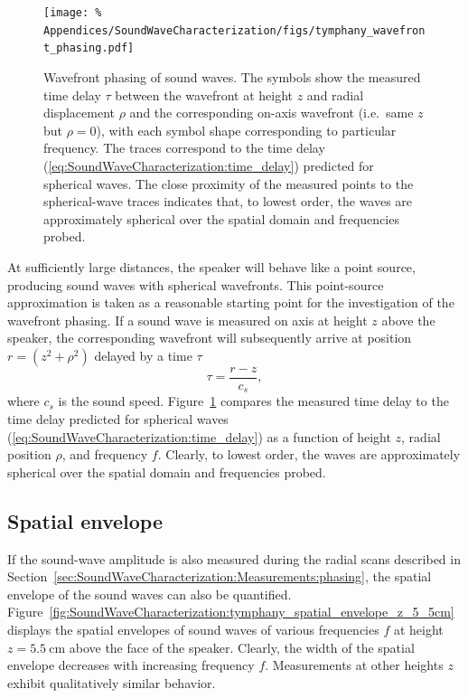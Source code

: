 \begin{figure}
  \centering
  \texttt{[image: \%
    Appendices/SoundWaveCharacterization/figs/tymphany\_wavefront\_phasing.pdf]}
  \caption[Wavefront phasing of sound waves]{%
    Wavefront phasing of sound waves.
    The symbols show the measured time delay $\tau$
    between the wavefront at height $z$ and radial displacement $\rho$ and
    the corresponding on-axis wavefront (i.e.\ same $z$ but $\rho = 0$),
    with each symbol shape corresponding to particular frequency.
    The traces correspond to the time delay
    (\ref{eq:SoundWaveCharacterization:time_delay})
    predicted for spherical waves.
    The close proximity of the measured points to the spherical-wave traces
    indicates that, to lowest order, the waves are approximately spherical
    over the spatial domain and frequencies probed.
  }
\label{fig:SoundWaveCharacterization:tymphany_wavefront_phasing}
\end{figure}

At sufficiently large distances,
the speaker will behave like a point source,
producing sound waves with spherical wavefronts.
This point-source approximation is taken as a reasonable
starting point for the investigation of the wavefront phasing.
If a sound wave is measured on axis at height $z$ above the speaker,
the corresponding wavefront will subsequently arrive
at position $r = (z^2 + \rho^2)$
delayed by a time $\tau$
\begin{equation}
  \tau = \frac{r - z}{c_s},
  \label{eq:SoundWaveCharacterization:time_delay}
\end{equation}
where $c_s$ is the sound speed.
Figure~\ref{fig:SoundWaveCharacterization:tymphany_wavefront_phasing}
compares the measured time delay to
the time delay predicted for spherical waves
(\ref{eq:SoundWaveCharacterization:time_delay})
as a function of height $z$, radial position $\rho$, and frequency $f$.
Clearly, to lowest order, the waves are approximately spherical
over the spatial domain and frequencies probed.


\subsection{Spatial envelope}
\label{sec:SoundWaveCharacterization:Measurements:envelope}
If the sound-wave amplitude is also measured
during the radial scans described in
Section~\ref{sec:SoundWaveCharacterization:Measurements:phasing},
the spatial envelope of the sound waves can also be quantified.
Figure~\ref{fig:SoundWaveCharacterization:tymphany_spatial_envelope_z_5_5cm}
displays the spatial envelopes of sound waves of various frequencies $f$
at height $z = \SI{5.5}{\centi\meter}$ above the face of the speaker.
Clearly, the width of the spatial envelope decreases
with increasing frequency $f$.
Measurements at other heights $z$
exhibit qualitatively similar behavior.

